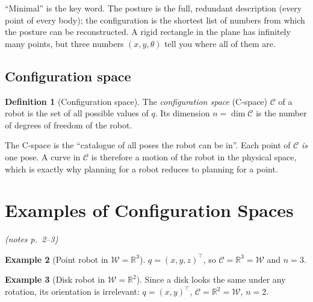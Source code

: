 \documentclass[11pt,a4paper]{article}
\newcommand{\R}{\mathbb{R}}
\newcommand{\W}{\mathcal{W}}
\newcommand{\C}{\mathcal{C}}
\newcommand{\pts}[1]{\emph{(notes p.~#1)}}
\theoremstyle{definition}
\newtheorem{definition}{Definition}[section]
\newtheorem{example}[definition]{Example}
\theoremstyle{plain}
\begin{document}
\begin{intuition}
``Minimal'' is the key word. The posture is the full, redundant description (every point of every body); the configuration is the shortest list of numbers from which the posture can be reconstructed. A rigid rectangle in the plane has infinitely many points, but three numbers $(x,y,\theta)$ tell you where all of them are.
\end{intuition}

\subsection{Configuration space}

\begin{definition}[Configuration space]
The \emph{configuration space} (C-space) $\C$ of a robot is the set of all possible values of $q$. Its dimension $n=\dim\C$ is the number of degrees of freedom of the robot.
\end{definition}

\begin{intuition}
The C-space is the ``catalogue of all poses the robot can be in''. Each point of $\C$ \emph{is} one pose. A curve in $\C$ is therefore a motion of the robot in the physical space, which is exactly why planning for a robot reduces to planning for a point.
\end{intuition}

\section{Examples of Configuration Spaces}\pts{2--3}

\begin{example}[Point robot in $\W=\R^3$]
$q=(x,y,z)^\top$, so $\C=\R^3=\W$ and $n=3$.
\end{example}

\begin{example}[Disk robot in $\W=\R^2$]
Since a disk looks the same under any rotation, its orientation is irrelevant: $q=(x,y)^\top$, $\C=\R^2=\W$, $n=2$.
\end{example}
\end{document}

